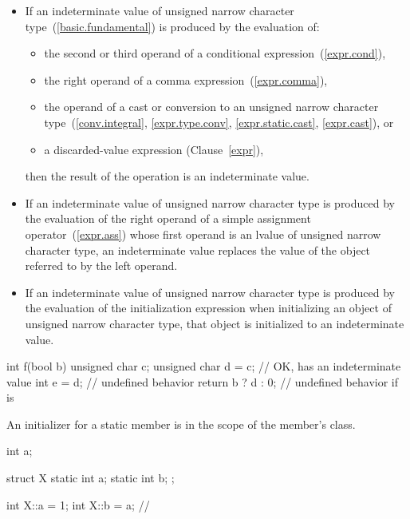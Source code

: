 \begin{itemize}
\item
If an indeterminate value of unsigned narrow character
type~(\ref{basic.fundamental}) is produced by the evaluation of:
\begin{itemize}
\item the second or third operand of a conditional expression~(\ref{expr.cond}),
\item the right operand of a comma expression~(\ref{expr.comma}),
\item the operand of a cast or conversion to an unsigned narrow character
type~(\ref{conv.integral}, \ref{expr.type.conv}, \ref{expr.static.cast},
\ref{expr.cast}), or
\item a discarded-value expression (Clause~\ref{expr}),
\end{itemize}
then the result of the operation is an indeterminate value.

\item
If an indeterminate value of unsigned narrow character
type is produced by the evaluation of the right
operand of a simple assignment operator~(\ref{expr.ass}) whose first operand
is an lvalue of unsigned narrow character type, an indeterminate value replaces
the value of the object referred to by the left operand.

\item
If an indeterminate value of unsigned narrow character type is produced by the
evaluation of the initialization expression when initializing an object of
unsigned narrow character type, that object is initialized to an indeterminate
value.
\end{itemize}
\begin{example}
\begin{codeblock}
  int f(bool b) {
    unsigned char c;
    unsigned char d = c;        // OK,  has an indeterminate value
    int e = d;                  // undefined behavior
    return b ? d : 0;           // undefined behavior if  is 
  }
\end{codeblock}
\end{example}

\pnum
{}%
An initializer for a static member is in the scope of the member's class.
\begin{example}
\begin{codeblock}
int a;

struct X {
  static int a;
  static int b;
};

int X::a = 1;
int X::b = a;                   // 
\end{codeblock}
\end{example}

